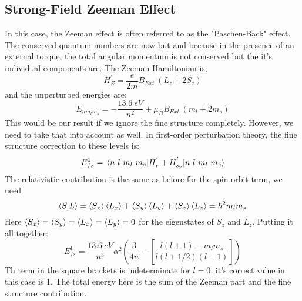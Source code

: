 \subsection{Strong-Field Zeeman Effect}
In this case, the Zeeman effect is often referred to as the "Paschen-Back" effect. The conserved quantum numbers are now but and because in the presence of an external torque, the total angular momentum is not conserved but the it's individual components are. The Zeeman Hamiltonian is,
\begin{equation}
H^{'}_{Z} =  \frac{e}{2m} B_{Ext.} (L_{z} + 2 S_{z})
\end{equation}
and the unperturbed energies are:
\begin{equation}
	E_{nm_{l}m_{s}} = -\frac{13.6 \ eV}{n^{2}} + \mu_{B}B_{Ext.}(m_{l} + 2 m_{s})
\end{equation}
This would be our result if we ignore the fine structure completely. However, we need to take that into account as well. In first-order perturbation theory, the fine structure correction to these levels is:
\begin{equation}
E^{1}_{fs} = \expval{H^{'}_{r} + H^{'}_{so}}{n \ l \ m_{l} \ m_{s}}
\end{equation}
The relativistic contribution is the same as before for the spin-orbit term, we need
\begin{equation}
\expval{S.L} = \expval{S_{x}}\expval{L_{x}} + \expval{S_{y}}\expval{L_{y}} + \expval{S_{z}}\expval{L_{z}} = \hbar^{2}m_{l}m_{s}
\end{equation}
Here $\expval{S_{x}} = \expval{S_{y}} = \expval{L_{x}} = \expval{L_{y}} = 0$ for the eigenstates of $S_{z}$ and $L_{z}$. Putting it all together:
\begin{equation}
E^{1}_{fs} = \frac{13.6 \ eV}{n^{3}}\alpha^{2} \left(\frac{3}{4n} - \left[ \frac{l(l+1)-m_{l}m_{s}}{l(l+1/2)(l+1)}\right]\right)
\end{equation}
Th term in the square brackets is indeterminate for $l=0$, it's correct value in this case is 1. The total energy here is the sum of the Zeeman part and the fine structure contribution.
